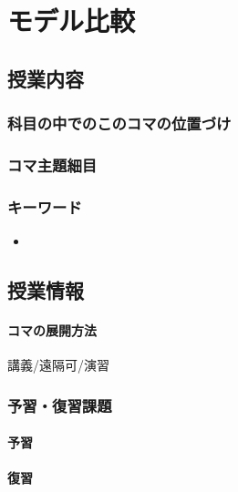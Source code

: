 \section{モデル比較}
\subsection{授業内容}
\subsubsection{科目の中でのこのコマの位置づけ}
\subsubsection{コマ主題細目}
\begin{description}
    \item[]
\end{description}
\subsubsection{キーワード}
\begin{itemize}
    \item
\end{itemize}
\subsection{授業情報}
\paragraph{コマの展開方法}
講義/遠隔可/演習
\subsubsection{予習・復習課題}
\paragraph{予習}
\paragraph{復習}